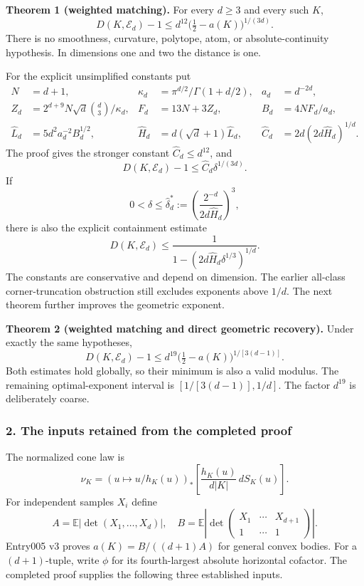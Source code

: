 \documentclass[
  11pt,
]{article}
\begin{document}
\textbf{Theorem 1 (weighted matching).} For every \(d\ge3\) and every
such \(K\), \[
\boxed{D(K,\mathcal E_d)-1
\le d^{12}\bigl(\tfrac12-a(K)\bigr)^{1/(3d)}.}                 \tag{1}
\] There is no smoothness, curvature, polytope, atom, or
absolute-continuity hypothesis. In dimensions one and two the distance
is one.

For the explicit unsimplified constants put \[
\begin{aligned}
N&=d+1,&\kappa_d&=\pi^{d/2}/\Gamma(1+d/2),&a_d&=d^{-2d},\\
Z_d&=2^{d+9}N\sqrt d\binom d3/\kappa_d,
&F_d&=13N+3Z_d,&B_d&=4NF_d/a_d,\\
\widehat L_d&=5d^2a_d^{-2}B_d^{1/2},
&\widehat H_d&=d(\sqrt d+1)\widehat L_d,
&\widehat C_d&=2d(2d\widehat H_d)^{1/d}.
\end{aligned}
\] The proof gives the stronger constant \(\widehat C_d\le d^{12}\), and
\[
D(K,\mathcal E_d)-1\le\widehat C_d\delta^{1/(3d)}.            \tag{2}
\] If \[
0<\delta\le\widehat\delta_d^*:=
 \left(\frac{2^{-d}}{2d\widehat H_d}\right)^3,
\] there is also the explicit containment estimate \[
D(K,\mathcal E_d)
\le\frac1{1-(2d\widehat H_d\delta^{1/3})^{1/d}}.              \tag{3}
\] The constants are conservative and depend on dimension. The earlier
all-class corner-truncation obstruction still excludes exponents above
\(1/d\). The next theorem further improves the geometric exponent.

\textbf{Theorem 2 (weighted matching and direct geometric recovery).}
Under exactly the same hypotheses, \[
\boxed{D(K,\mathcal E_d)-1
\le d^{19}\bigl(\tfrac12-a(K)\bigr)^{1/[3(d-1)]}.}             \tag{8}
\] Both estimates hold globally, so their minimum is also a valid
modulus. The remaining optimal-exponent interval is
\([1/[3(d-1)],1/d]\). The factor \(d^{19}\) is deliberately coarse.

\subsubsection{2. The inputs retained from the completed
proof}\label{the-inputs-retained-from-the-completed-proof}

The normalized cone law is \[
\nu_K=(u\mapsto u/h_K(u))_*
       \left[\frac{h_K(u)}{d|K|}\,dS_K(u)\right].
\] For independent samples \(X_i\) define \[
A=\mathbb E|\det(X_1,\ldots,X_d)|,\quad
B=\mathbb E\left|\det\begin{pmatrix}
X_1&\cdots&X_{d+1}\\1&\cdots&1
\end{pmatrix}\right|.
\] Entry005 v3 proves \(a(K)=B/((d+1)A)\) for general convex bodies. For
a \((d+1)\)-tuple, write \(\phi\) for its fourth-largest absolute
horizontal cofactor. The completed proof supplies the following three
established inputs.
\end{document}
